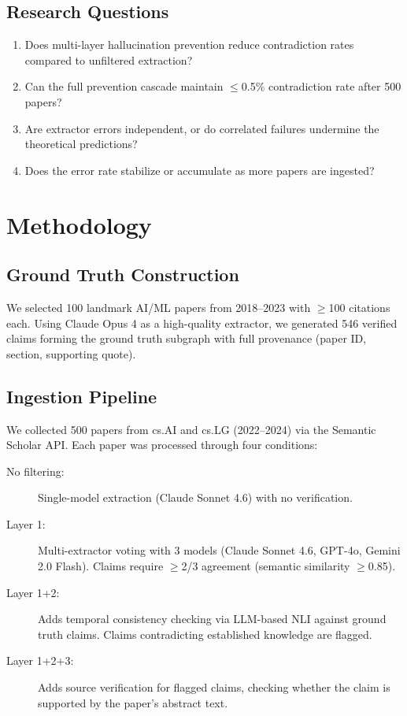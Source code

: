 \documentclass[11pt,a4paper]{article}
\begin{document}
\subsection{Research Questions}

\begin{enumerate}
    \item Does multi-layer hallucination prevention reduce contradiction rates compared to unfiltered extraction?
    \item Can the full prevention cascade maintain $\leq$0.5\% contradiction rate after 500 papers?
    \item Are extractor errors independent, or do correlated failures undermine the theoretical predictions?
    \item Does the error rate stabilize or accumulate as more papers are ingested?
\end{enumerate}

\section{Methodology}

\subsection{Ground Truth Construction}

We selected 100 landmark AI/ML papers from 2018--2023 with $\geq$100 citations each. Using Claude Opus 4 as a high-quality extractor, we generated 546 verified claims forming the ground truth subgraph with full provenance (paper ID, section, supporting quote).

\subsection{Ingestion Pipeline}

We collected 500 papers from cs.AI and cs.LG (2022--2024) via the Semantic Scholar API. Each paper was processed through four conditions:

\begin{description}
    \item[No filtering:] Single-model extraction (Claude Sonnet 4.6) with no verification.
    \item[Layer 1:] Multi-extractor voting with 3 models (Claude Sonnet 4.6, GPT-4o, Gemini 2.0 Flash). Claims require $\geq$2/3 agreement (semantic similarity $\geq$0.85).
    \item[Layer 1+2:] Adds temporal consistency checking via LLM-based NLI against ground truth claims. Claims contradicting established knowledge are flagged.
    \item[Layer 1+2+3:] Adds source verification for flagged claims, checking whether the claim is supported by the paper's abstract text.
\end{description}
\end{document}
